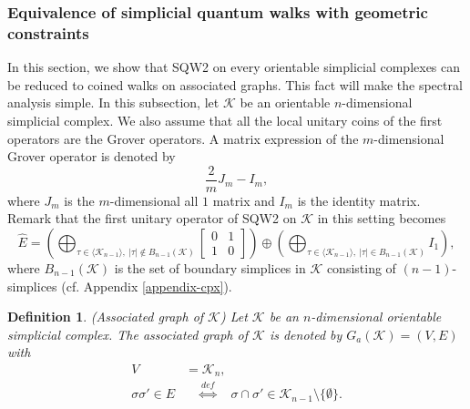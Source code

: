 \documentclass[a4paper,12pt]{article}
\newtheorem{definition}{Definition}[section]
\newcommand{\bra}{\langle}
\newcommand{\ket}{\rangle}
\numberwithin{equation}{section}
\begin{document}
\subsubsection{Equivalence of simplicial quantum walks with geometric constraints}
In this section, we show that SQW2 on every orientable simplicial complexes can be reduced to coined walks on associated graphs.
This fact will make the spectral analysis simple. 
In this subsection, let $\mathcal{K}$ be an orientable $n$-dimensional simplicial complex.
We also assume that all the local unitary coins of the first operators are the Grover operators. 
A matrix expression of the $m$-dimensional Grover operator is denoted by 
\begin{equation*}
\frac{2}{m}J_m-I_m,
\end{equation*}
where $J_m$ is the $m$-dimensional all $1$ matrix and $I_m$ is the identity matrix. 
Remark that the first unitary operator of SQW2 on $\mathcal{K}$ in this setting becomes  
\begin{equation*}
\hat{E}= \left( \bigoplus_{\tau \in \bra \mathcal{K}_{n-1}\ket,\ |\tau|\not \in B_{n-1}(\mathcal{K})} \begin{bmatrix} 0 & 1 \\ 1 & 0 \end{bmatrix}  \right) 
\oplus 
\left( \bigoplus_{\tau \in \bra \mathcal{K}_{n-1}\ket,\ |\tau| \in B_{n-1}(\mathcal{K})} I_1 \right),
\end{equation*}
where $B_{n-1}(\mathcal{K})$ is the set of boundary simplices in $\mathcal{K}$ consisting of $(n-1)$-simplices (cf. Appendix \ref{appendix-cpx}). 
\begin{definition}\rm
(Associated graph of $\mathcal{K}$) 
Let $\mathcal{K}$ be an $n$-dimensional orientable simplicial complex. 
The {\em associated graph of $\mathcal{K}$} is denoted by $G_a(\mathcal{K})=(V,E)$ with 
\begin{align*}
        V &= \mathcal{K}_n,  \\ 
        \sigma\sigma' \in E &\quad \stackrel{def}{\Leftrightarrow}\quad \sigma \cap \sigma'\in \mathcal{K}_{n-1}\setminus \{\emptyset\}.
\end{align*}
\end{definition}
\end{document}
